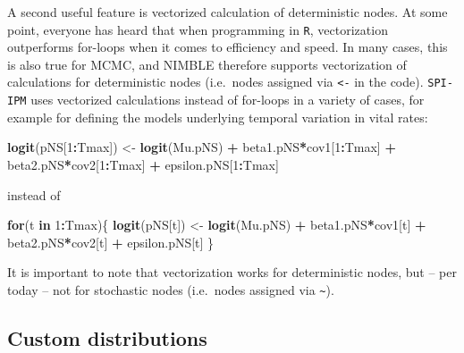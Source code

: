 \documentclass[
]{book}
\newenvironment{Shaded}{\begin{snugshade}}{\end{snugshade}}
\newcommand{\ControlFlowTok}[1]{\textcolor[rgb]{0.13,0.29,0.53}{\textbf{#1}}}
\newcommand{\DecValTok}[1]{\textcolor[rgb]{0.00,0.00,0.81}{#1}}
\newcommand{\KeywordTok}[1]{\textcolor[rgb]{0.13,0.29,0.53}{\textbf{#1}}}
\newcommand{\NormalTok}[1]{#1}
\newcommand{\OperatorTok}[1]{\textcolor[rgb]{0.81,0.36,0.00}{\textbf{#1}}}
\newcommand{\StringTok}[1]{\textcolor[rgb]{0.31,0.60,0.02}{#1}}
\begin{document}
A second useful feature is vectorized calculation of deterministic nodes. At
some point, everyone has heard that when programming in \texttt{R}, vectorization
outperforms for-loops when it comes to efficiency and speed. In many cases, this
is also true for MCMC, and NIMBLE therefore supports vectorization of
calculations for deterministic nodes (i.e.~nodes assigned via \texttt{\textless{}-} in the code).
\texttt{SPI-IPM} uses vectorized calculations instead of for-loops in a variety of
cases, for example for defining the models underlying temporal variation in
vital rates:

\begin{Shaded}
\begin{Highlighting}[]
\KeywordTok{logit}\NormalTok{(pNS[}\DecValTok{1}\OperatorTok{:}\NormalTok{Tmax]) <-}\StringTok{ }\KeywordTok{logit}\NormalTok{(Mu.pNS) }\OperatorTok{+}\StringTok{ }\NormalTok{beta1.pNS}\OperatorTok{*}\NormalTok{cov1[}\DecValTok{1}\OperatorTok{:}\NormalTok{Tmax] }\OperatorTok{+}\StringTok{ }\NormalTok{beta2.pNS}\OperatorTok{*}\NormalTok{cov2[}\DecValTok{1}\OperatorTok{:}\NormalTok{Tmax] }\OperatorTok{+}\StringTok{ }\NormalTok{epsilon.pNS[}\DecValTok{1}\OperatorTok{:}\NormalTok{Tmax]}
\end{Highlighting}
\end{Shaded}

instead of

\begin{Shaded}
\begin{Highlighting}[]
\ControlFlowTok{for}\NormalTok{(t }\ControlFlowTok{in} \DecValTok{1}\OperatorTok{:}\NormalTok{Tmax)\{}
  \KeywordTok{logit}\NormalTok{(pNS[t]) <-}\StringTok{ }\KeywordTok{logit}\NormalTok{(Mu.pNS) }\OperatorTok{+}\StringTok{ }\NormalTok{beta1.pNS}\OperatorTok{*}\NormalTok{cov1[t] }\OperatorTok{+}\StringTok{ }\NormalTok{beta2.pNS}\OperatorTok{*}\NormalTok{cov2[t] }\OperatorTok{+}\StringTok{ }\NormalTok{epsilon.pNS[t]}
\NormalTok{\}}
\end{Highlighting}
\end{Shaded}

It is important to note that vectorization works for deterministic nodes, but
-- per today -- not for stochastic nodes (i.e.~nodes assigned via \texttt{\textasciitilde{}}).

\hypertarget{custom-distributions}{%
\subsection{Custom distributions}\label{custom-distributions}}
\end{document}
